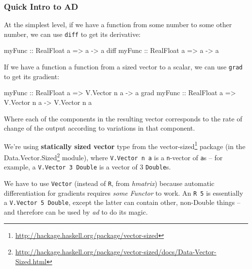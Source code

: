 \documentclass[]{article}
\newenvironment{Shaded}{}{}
\newcommand{\DataTypeTok}[1]{\textcolor[rgb]{0.56,0.13,0.00}{#1}}
\newcommand{\OtherTok}[1]{\textcolor[rgb]{0.00,0.44,0.13}{#1}}
\newcommand{\NormalTok}[1]{#1}
\renewcommand{\href}[2]{#2\footnote{\url{#1}}}
\begin{document}
\subsubsection{Quick Intro to AD}\label{quick-intro-to-ad}

At the simplest level, if we have a function from some number to some other
number, we can use \texttt{diff} to get its derivative:

\begin{Shaded}
\begin{Highlighting}[]
\OtherTok{myFunc      ::} \DataTypeTok{RealFloat}\NormalTok{ a }\OtherTok{=>}\NormalTok{ a }\OtherTok{->}\NormalTok{ a}
\NormalTok{diff}\OtherTok{ myFunc ::} \DataTypeTok{RealFloat}\NormalTok{ a }\OtherTok{=>}\NormalTok{ a }\OtherTok{->}\NormalTok{ a}
\end{Highlighting}
\end{Shaded}

If we have a function a function from a sized vector to a scalar, we can use
\texttt{grad} to get its gradient:

\begin{Shaded}
\begin{Highlighting}[]
\OtherTok{myFunc      ::} \DataTypeTok{RealFloat}\NormalTok{ a }\OtherTok{=>} \DataTypeTok{V.Vector}\NormalTok{ n a }\OtherTok{->}\NormalTok{ a}
\NormalTok{grad}\OtherTok{ myFunc ::} \DataTypeTok{RealFloat}\NormalTok{ a }\OtherTok{=>} \DataTypeTok{V.Vector}\NormalTok{ n a }\OtherTok{->} \DataTypeTok{V.Vector}\NormalTok{ n a}
\end{Highlighting}
\end{Shaded}

Where each of the components in the resulting vector corresponds to the rate of
change of the output according to variations in that component.

We're using \textbf{statically sized vector} type from the
\href{http://hackage.haskell.org/package/vector-sized}{vector-sized} package (in
the
\href{http://hackage.haskell.org/package/vector-sized/docs/Data-Vector-Sized.html}{Data.Vector.Sized}
module), where \texttt{V.Vector\ n\ a} is a \texttt{n}-vector of \texttt{a}s --
for example, a \texttt{V.Vector\ 3\ Double} is a vector of 3 \texttt{Double}s.

We have to use \texttt{Vector} (instead of \texttt{R}, from \emph{hmatrix})
because automatic differentiation for gradients requires \emph{some Functor} to
work. An \texttt{R\ 5} is essentially a \texttt{V.Vector\ 5\ Double}, except the
latter can contain other, non-Double things -- and therefore can be used by
\emph{ad} to do its magic.
\end{document}
